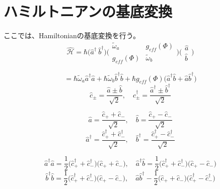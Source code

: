 \section{ハミルトニアンの基底変換}
ここでは、Hamiltonianの基底変換を行う。
\begin{equation}
    \hat{\mathcal{H}}=\hbar\biggl(\hat{a}^{\dagger }\ \hat{b}^{\dagger }\biggr)\biggl(\begin{array}{cc}
    \tilde{\omega}_{a} & g_{eff}(\Phi ) \\
    g_{eff}(\Phi ) & \tilde{\omega}_{b}
    \end{array}\biggr)\biggl(\begin{array}{l}
    \hat{a} \\
    \hat{b}
    \end{array}\biggr)
\end{equation}

\begin{equation}
    = \hbar \tilde{\omega}_{a} \hat{a}^{\dagger} \hat{a}+\hbar \tilde{\omega}_{b} \hat{b}^{\dagger} \hat{b}+\hbar g_{eff}(\Phi)\biggl(\hat{a}^{\dagger}\hat{b}+\hat{a} \hat{b}^{\dagger}\biggr)
\end{equation}
\begin{equation}
    \hat{c}_{\pm}=\frac{\hat{a} \pm \hat{b}}{\sqrt{2}} ,\quad \hat{c}_{\pm}^{\dagger}=\frac{\hat{a}^{\dagger} \pm \hat{b}^{\dagger}}{\sqrt{2}}
\end{equation}

\begin{equation}
    \hat{a}=\frac{\hat{c}_{+}+\hat{c}_{-}}{\sqrt{2}} ,\quad \hat{b}=\frac{\hat{c}_{+}-\hat{c}_{-}}{\sqrt{2}}
\end{equation}
\begin{equation}
    \hat{a}^{\dagger}=\frac{\hat{c}_{+}^{\dagger}+\hat{c}_{-}^{\dagger}}{\sqrt{2}} ,\quad \hat{b}^{\dagger}=\frac{\hat{c}_{+}^{\dagger}-\hat{c}_{-}^{\dagger}}{\sqrt{2}}
\end{equation}

\begin{equation}
    \hat{a}^{\dagger} \hat{a}=\frac{1}{2}\biggl(\hat{c}_{+}^{\dagger}+\hat{c}_{-}^{\dagger}\biggr) \biggl(\hat{c}_{+}+\hat{c}_{-}\biggr) ,\quad \hat{a}^{\dagger} \hat{b}=\frac{1}{2}\biggl(\hat{c}_{+}^{\dagger}+\hat{c}_{-}^{\dagger}\biggr)\biggl(\hat{c}_{+}-\hat{c}_{-}\biggr)
\end{equation}
\begin{equation}
    \hat{b}^{\dagger} \hat{b}=\frac{1}{2}\biggl(\hat{c}_{+}^{\dagger}+\hat{c}_{-}^{\dagger}\biggr)\biggl(\hat{c}_{+}-\hat{c}_{-}\biggr) ,\quad \hat{a} \hat{b}^{\dagger}-\frac{1}{2}\biggl(\hat{c}_{+}+\hat{c}_{-}\biggr)\biggl(\hat{c}_{+}^{\dagger}-\hat{c}_{-}^{\dagger}\biggr)
\end{equation}


